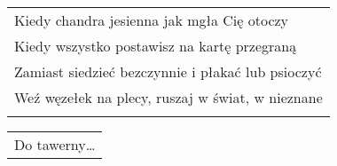 \documentclass[a5paper]{article}
\begin{document}
\noindent
\begin{tabular}{@{}p{8.00cm}@{}}
Kiedy chandra jesienna jak mgła Cię otoczy \\
Kiedy wszystko postawisz na kartę przegraną \\
Zamiast siedzieć bezczynnie i płakać lub psioczyć \\
Weź węzełek na plecy, ruszaj w świat, w nieznane \\ \\
\end{tabular}

\noindent
\begin{tabular}{@{}p{7.00cm}@{}}
Do tawerny…
\end{tabular}
\end{document}
